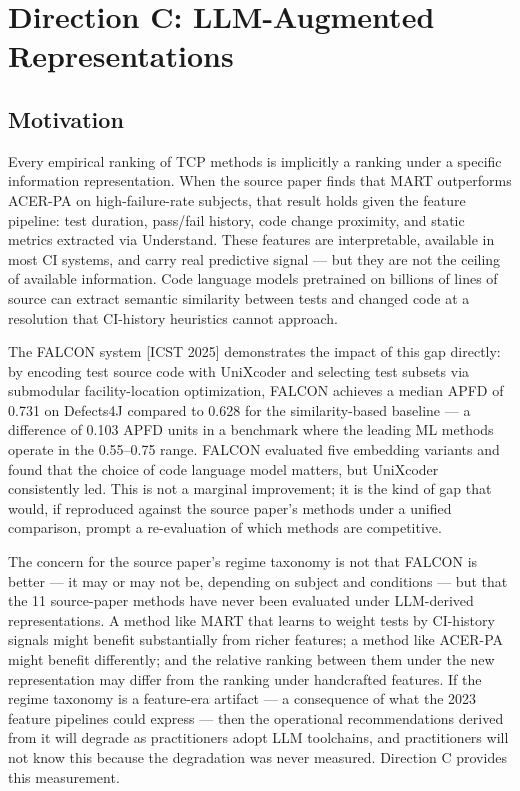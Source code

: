 \documentclass[conference]{IEEEtran}
\begin{document}
\section{Direction C: LLM-Augmented Representations}

\subsection{Motivation}

Every empirical ranking of TCP methods is implicitly a ranking under a specific information representation. When the source paper finds that MART outperforms ACER-PA on high-failure-rate subjects, that result holds given the feature pipeline: test duration, pass/fail history, code change proximity, and static metrics extracted via Understand. These features are interpretable, available in most CI systems, and carry real predictive signal — but they are not the ceiling of available information. Code language models pretrained on billions of lines of source can extract semantic similarity between tests and changed code at a resolution that CI-history heuristics cannot approach.


The FALCON system [ICST 2025] demonstrates the impact of this gap directly: by encoding test source code with UniXcoder and selecting test subsets via submodular facility-location optimization, FALCON achieves a median APFD of 0.731 on Defects4J compared to 0.628 for the similarity-based baseline — a difference of 0.103 APFD units in a benchmark where the leading ML methods operate in the 0.55–0.75 range. FALCON evaluated five embedding variants and found that the choice of code language model matters, but UniXcoder consistently led. This is not a marginal improvement; it is the kind of gap that would, if reproduced against the source paper's methods under a unified comparison, prompt a re-evaluation of which methods are competitive.


The concern for the source paper's regime taxonomy is not that FALCON is better — it may or may not be, depending on subject and conditions — but that the 11 source-paper methods have never been evaluated under LLM-derived representations. A method like MART that learns to weight tests by CI-history signals might benefit substantially from richer features; a method like ACER-PA might benefit differently; and the relative ranking between them under the new representation may differ from the ranking under handcrafted features. If the regime taxonomy is a feature-era artifact — a consequence of what the 2023 feature pipelines could express — then the operational recommendations derived from it will degrade as practitioners adopt LLM toolchains, and practitioners will not know this because the degradation was never measured. Direction C provides this measurement.
\end{document}
